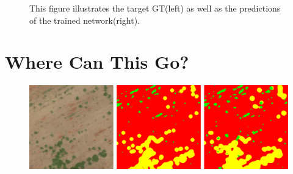 \documentclass[
    ,title     = {{Image Segmentation for Smart Agriculture}}
    ,subject   = {{This is the subject of my work}}
    ,papersize = {{a1paper}}
    ,nocrop
]{dtuposter}
\begin{document}
\begin{dtupostercontent}

\begin{figure}
	\centering
{}
\caption{This figure illustrates the target GT(left) as well as the predictions of the trained network(right).}\label{fig:example}
\end{figure}



\section{Where Can This Go?}

\begin{figure}
	\begin{center}
			\includegraphics[width=\linewidth,origin=c]{reconst}
	\end{center}
\end{figure}


\end{dtupostercontent}
\end{document}
